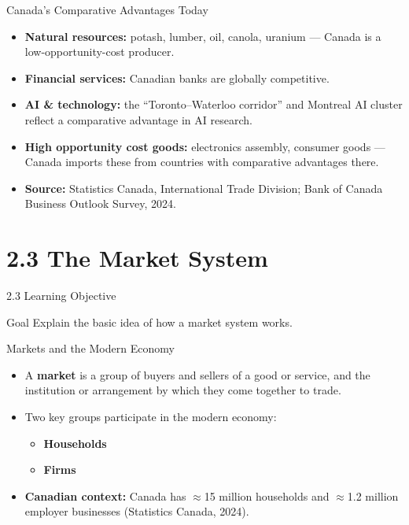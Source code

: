 \documentclass[aspectratio=169]{beamer}
\begin{document}
\begin{frame}{Canada's Comparative Advantages Today}
\transfade
\begin{itemize}[<+->]
  \item \textbf{Natural resources:} potash, lumber, oil, canola, uranium --- Canada is a low-opportunity-cost producer.
  \item \textbf{Financial services:} Canadian banks are globally competitive.
  \item \textbf{AI \& technology:} the ``Toronto--Waterloo corridor'' and Montreal AI cluster reflect a comparative advantage in AI research.
  \item \textbf{High opportunity cost goods:} electronics assembly, consumer goods --- Canada imports these from countries with comparative advantages there.
  \item \textbf{Source:} Statistics Canada, International Trade Division; Bank of Canada Business Outlook Survey, 2024.
\end{itemize}
\end{frame}

\section{2.3 The Market System}

\begin{frame}{2.3 Learning Objective}
\transfade
\begin{block}{Goal}
Explain the basic idea of how a market system works.
\end{block}
\end{frame}

\begin{frame}{Markets and the Modern Economy}
\transfade
\begin{itemize}[<+->]
  \item A \textbf{market} is a group of buyers and sellers of a good or service, and the institution or arrangement by which they come together to trade.
  \item Two key groups participate in the modern economy:
  \begin{itemize}[<+->]
    \item \textbf{Households}
    \item \textbf{Firms}
  \end{itemize}
  \item \textbf{Canadian context:} Canada has $\approx$15 million households and $\approx$1.2 million employer businesses (Statistics Canada, 2024).
\end{itemize}
\end{frame}
\end{document}

